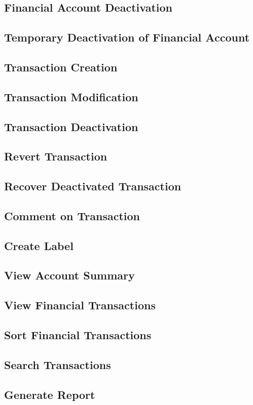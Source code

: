 \documentclass{article}
\begin{document}
\subsection{Financial Account Deactivation}
\subsection{Temporary Deactivation of Financial Account}
\subsection{Transaction Creation}
\subsection{Transaction Modification}
\subsection{Transaction Deactivation}
\subsection{Revert Transaction}
\subsection{Recover Deactivated Transaction}
\subsection{Comment on Transaction}
\subsection{Create Label}
\subsection{View Account Summary}
\subsection{View Financial Transactions}
\subsection{Sort Financial Transactions}
\subsection{Search Transactions}
\subsection{Generate Report}
\end{document}
